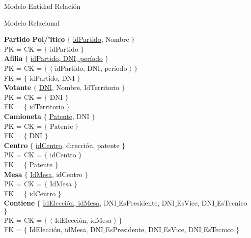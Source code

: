 \begin{section}{Modelo Entidad Relaci\'on}

\begin{subsection}{Modelo Relacional}

\textbf{Partido Pol/'itico} $\lbrace$ \underline{idPartido}, Nombre $\rbrace$ \\
PK = CK = $ \lbrace $ idPartido $ \rbrace $ \\

\textbf{Afilia} $ \lbrace $ \underline{idPartido, DNI, per\'iodo} $ \rbrace $\\
PK = CK = $ \lbrace $ $ \langle $ idPartido, DNI, per\'iodo $ \rangle $  $ \rbrace $\\
FK = $ \lbrace $ idPartido, DNI $ \rbrace $\\

\textbf{Votante} $ \lbrace $ \underline{DNI}, Nombre, IdTerritorio $ \rbrace $\\
PK = CK = $ \lbrace $ DNI $ \rbrace $\\
FK = $ \lbrace $ idTerritorio $ \rbrace $\\

\textbf{Camioneta} $ \lbrace $ \underline{Patente}, DNI $ \rbrace $\\
PK = CK = $ \lbrace $ Patente  $ \rbrace $\\
FK = $ \lbrace $ DNI $ \rbrace $\\

\textbf{Centro} $ \lbrace $ \underline{idCentro}, direcci\'on, patente $ \rbrace $ \\
PK = CK = $ \lbrace $ idCentro $ \rbrace $ \\
FK = $ \lbrace $ Patente $ \rbrace $\\

\textbf{Mesa} $ \lbrace $ \underline{IdMesa}, idCentro $ \rbrace $ \\
PK = CK = $ \lbrace $ IdMesa $ \rbrace $ \\
FK = $ \lbrace $ idCentro $ \rbrace $\\

\textbf{Contiene} $ \lbrace $ \underline{IdElecci\'on, idMesa}, DNI$\_$EsPresidente, DNI$\_$EsVice, DNI$\_$EsTecnico $ \rbrace $ \\
PK = CK = $ \lbrace $ $ \langle $ IdElecci\'on, idMesa $ \rangle $ $ \rbrace $ \\
FK = $ \lbrace $ IdElecci\'on, idMesa, DNI$\_$EsPresidente, DNI$\_$EsVice, DNI$\_$EsTecnico $ \rbrace $\\


\end{subsection}
\end{section}
